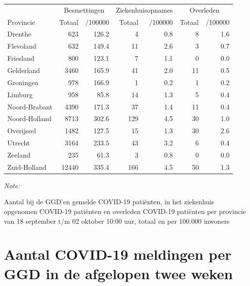 \documentclass[
  english,
  man,floatsintext]{apa6}
\begin{document}
\begin{table}[H]
\centering
\begin{threeparttable}
\begin{tabular}{lrrrrrr}
\toprule
\multicolumn{1}{c}{ } & \multicolumn{2}{c}{Besmettingen} & \multicolumn{2}{c}{Ziekenhuisopnames} & \multicolumn{2}{c}{Overleden} \\
\cmidrule(l{3pt}r{3pt}){2-3} \cmidrule(l{3pt}r{3pt}){4-5} \cmidrule(l{3pt}r{3pt}){6-7}
Provincie & Totaal & /100000 & Totaal & /100000 & Totaal & /100000\\
\midrule
Drenthe & 623 & 126.2 & 4 & 0.8 & 8 & 1.6\\
Flevoland & 632 & 149.4 & 11 & 2.6 & 3 & 0.7\\
Friesland & 800 & 123.1 & 7 & 1.1 & 0 & 0.0\\
Gelderland & 3460 & 165.9 & 41 & 2.0 & 11 & 0.5\\
Groningen & 978 & 166.9 & 1 & 0.2 & 1 & 0.2\\
Limburg & 958 & 85.8 & 14 & 1.3 & 5 & 0.4\\
Noord-Brabant & 4390 & 171.3 & 37 & 1.4 & 11 & 0.4\\
Noord-Holland & 8713 & 302.6 & 129 & 4.5 & 30 & 1.0\\
Overijssel & 1482 & 127.5 & 15 & 1.3 & 30 & 2.6\\
Utrecht & 3164 & 233.5 & 43 & 3.2 & 6 & 0.4\\
Zeeland & 235 & 61.3 & 3 & 0.8 & 0 & 0.0\\
Zuid-Holland & 12440 & 335.4 & 166 & 4.5 & 50 & 1.3\\
\bottomrule
\end{tabular}
\begin{tablenotes}
\item \textit{Note: } 
\item Aantal bij de GGD’en gemelde COVID-19 patiënten, in het ziekenhuis opgenomen COVID-19 patiënten en overleden COVID-19 patiënten per provincie van 18 september t/m 02 oktober 10:00 uur, totaal en per 100.000 inwoners
\end{tablenotes}
\end{threeparttable}
\end{table}

\newpage

\hypertarget{aantal-covid-19-meldingen-per-ggd-in-de-afgelopen-twee-weken}{%
\section{Aantal COVID-19 meldingen per GGD in de afgelopen twee weken}\label{aantal-covid-19-meldingen-per-ggd-in-de-afgelopen-twee-weken}}
\end{document}
